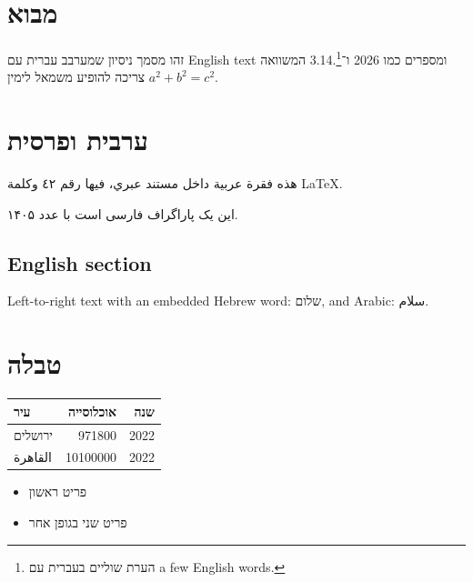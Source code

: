 \documentclass[11pt,twocolumn]{article}
\begin{document}
\section{מבוא}
זהו מסמך ניסיון שמערבב עברית עם \foreignlanguage{english}{English text}
ומספרים כמו 2026 ו־3.14.\footnote{הערת שוליים בעברית עם \foreignlanguage{english}{a few English words}.}
המשוואה $a^2 + b^2 = c^2$ צריכה להופיע משמאל לימין.

\section{ערבית ופרסית}
\begin{otherlanguage}{arabic}
هذه فقرة عربية داخل مستند عبري، فيها رقم ٤٢ وكلمة \foreignlanguage{english}{LaTeX}.
\end{otherlanguage}

\begin{otherlanguage}{persian}
این یک پاراگراف فارسی است با عدد ۱۴۰۵.
\end{otherlanguage}

\begin{otherlanguage}{english}
\section{English section}
Left-to-right text with an embedded Hebrew word: \foreignlanguage{hebrew}{שלום},
and Arabic: \foreignlanguage{arabic}{سلام}.
\end{otherlanguage}

\section{טבלה}
\begin{tabular}{lrr}
  \toprule
  עיר & אוכלוסייה & שנה \\
  \midrule
  ירושלים & 971800 & 2022 \\
  \foreignlanguage{arabic}{القاهرة} & 10100000 & 2022 \\
  \bottomrule
\end{tabular}

\begin{itemize}
  \item פריט ראשון
  \item {\sffamily פריט שני בגופן אחר}
\end{itemize}
\end{document}
